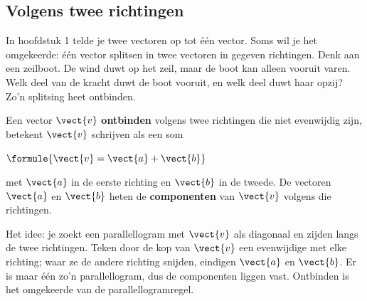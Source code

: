 \subsection{Volgens twee richtingen}

In hoofdstuk 1 telde je twee vectoren op tot één vector. Soms wil je het omgekeerde: één vector splitsen in twee vectoren in gegeven richtingen. Denk aan een zeilboot. De wind duwt op het zeil, maar de boot kan alleen vooruit varen. Welk deel van de kracht duwt de boot vooruit, en welk deel duwt haar opzij? Zo'n splitsing heet ontbinden.

\begin{theorie}
\begin{minipage}[t]{.6\linewidth}
\vspace{0pt}
Een vector $\vect{v}$ \textbf{\textcolor{accent}{ontbinden}} volgens twee richtingen die niet evenwijdig zijn, betekent $\vect{v}$ schrijven als een som

\vspace{1mm}
\qquad $\formule{\vect{v} = \vect{a} + \vect{b}}$

\vspace{1mm}
met $\vect{a}$ in de eerste richting en $\vect{b}$ in de tweede. De vectoren $\vect{a}$ en $\vect{b}$ heten de \textbf{\textcolor{accent}{componenten}} van $\vect{v}$ volgens die richtingen.
\end{minipage}\hfill
\begin{minipage}[t]{.36\linewidth}
\vspace{1mm}
\centering
{}
\end{minipage}
\end{theorie}

Het idee: je zoekt een parallellogram met $\vect{v}$ als diagonaal en zijden langs de twee richtingen. Teken door de kop van $\vect{v}$ een evenwijdige met elke richting; waar ze de andere richting snijden, eindigen $\vect{a}$ en $\vect{b}$. Er is maar één zo'n parallellogram, dus de componenten liggen vast. Ontbinden is het omgekeerde van de parallellogramregel.


